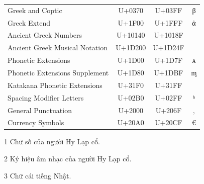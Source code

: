 \begin{table}[htb]
\begin{threeparttable}
\begin{tabular}{lccc}
            Greek and Coptic                        & U+0370                                      & U+03FF                           & β \\
            Greek Extend                            & U+1F00                                      & U+1FFF                           & ἀ \\
            Ancient Greek Numbers\tnote{1}          & U+10140                                     & U+1018F                          &   \\
            Ancient Greek Musical Notation\tnote{2} & U+1D200                                     & U+1D24F                          &   \\
            Phonetic Extensions                     & U+1D00                                      & U+1D7F                           & ᴀ \\
            Phonetic Extensions Supplement          & U+1D80                                      & U+1DBF                           & ᶆ \\
            Katakana Phonetic Extensions\tnote{3}   & U+31F0                                      & U+31FF                           &   \\
            Spacing Modifier Letters                & U+02B0                                      & U+02FF                           & ʰ \\
            General Punctuation                     & U+2000                                      & U+206F                           & ‚ \\
            Currency Symbols                        & U+20A0                                      & U+20CF                           & € \\
            \bottomrule
        \end{tabular}
        \begin{tablenotes}
            \item [1] Chữ số của người Hy Lạp cổ.
            \item [2] Ký hiệu âm nhạc của người Hy Lạp cổ.
            \item [3] Chữ cái tiếng Nhật.
        \end{tablenotes}
    \end{threeparttable}
\end{table}

